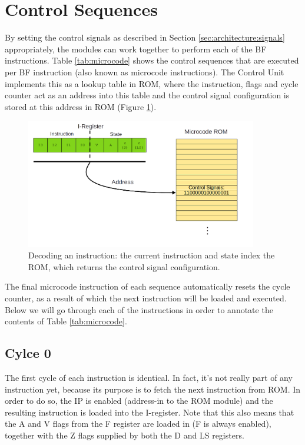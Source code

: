 \section{Control Sequences} \label{sec:sequences}
By setting the control signals as described in Section \ref{sec:architecture:signals} appropriately, the modules can work together to perform each of the BF instructions. Table \ref{tab:microcode} shows the control sequences that are executed per BF instruction (also known as microcode instructions). The Control Unit implements this as a lookup table in ROM, where the instruction, flags and cycle counter act as an address into this table and the control signal configuration is stored at this address in ROM (Figure \ref{fig:decoder}).

\begin{figure}[H]
  \centering
  \includegraphics[width=0.9\textwidth]{img/instruction_decoding}
  \caption{Decoding an instruction: the current instruction and state index the ROM, which returns the control signal configuration.}
  \label{fig:decoder}
\end{figure}

The final microcode instruction of each sequence automatically resets the cycle counter, as a result of which the next instruction will be loaded and executed. Below we will go through each of the instructions in order to annotate the contents of Table \ref{tab:microcode}.


\subsection{Cylce 0}
The first cycle of each instruction is identical. In fact, it's not really part of any instruction yet, because its purpose is to fetch the next instruction from ROM. In order to do so, the IP is enabled (address-in to the ROM module) and the resulting instruction is loaded into the I-register. Note that this also means that the A and V flags from the F register are loaded in (F is always enabled), together with the Z flags supplied by both the D and LS registers.

